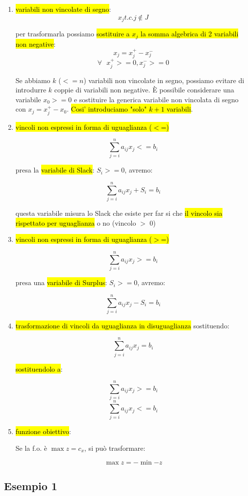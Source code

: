 \begin{enumerate}
	\item \hl{variabili non vincolate di segno}: $$x_j t.c. j \notin J$$

		per trasformarla possiamo \hl{sostituire a $x_j$ la somma algebrica di 2 variabili non negative}: $$x_j = x_j^+ - x_j^-$$ $$\forall\ \ \ x_j^+ >= 0, x_j^- >= 0$$

		Se abbiamo $k$ ($<= n$) variabili non vincolate in segno, possiamo evitare di introdurre $k$ coppie di variabili non negative. È possibile considerare una variabile $x_0 >= 0$ e sostituire la generica variabile non vincolata di segno con $x_j = x_j^+ - x_0$. \hl{Cosi' introduciamo "solo" $k+1$ variabili}.
	
	\item \hl{vincoli non espressi in forma di uguaglianza ($<$=)}
		
		$$\sum_{j=i}^n a_{ij} x_j <= b_i$$
		
		presa la \hl{variabile di Slack}: $S_i >= 0$, avremo:
	
		$$\sum_{j=i}^n a_{ij} x_j + S_i = b_i$$
	
	
		questa variabile misura lo Slack che esiste per far si che \hl{il vincolo sia rispettato per uguaglianza} o no (vincolo $>$ 0)
		
	\item \hl{vincoli non espressi in forma di uguaglianza ($>$=)}
	
		$$\sum_{j=i}^n a_{ij} x_j >= b_i$$
		
		presa una \hl{variabile di Surplus}: $S_i >= 0$, avremo:
		
		$$\sum_{j=i}^n a_{ij} x_j - S_i = b_i$$
		
	\item \hl{trasformazione di vincoli da uguaglianza in disuguaglianza} sostituendo:

		$$\sum_{j=i}^n a_{ij} x_j = b_i$$
		
		\hl{sostituendolo a}:
		
		$$\sum_{j=i}^n a_{ij} x_j >= b_i$$
		$$\sum_{j=i}^n a_{ij} x_j <= b_i$$
		
	\item \hl{funzione obiettivo}:
	
		Se la f.o. è $\max z = c_x$, si può trasformare:
	
		$$\max z = -\min {-z}$$

	
\end{enumerate}


\subsection{Esempio 1}

